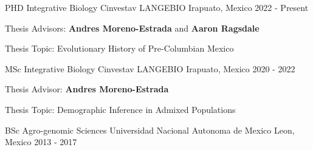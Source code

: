 

\begin{cventries}

\cventry
    {PHD Integrative Biology} %
    {Cinvestav LANGEBIO} %
    {Irapuato, Mexico} %
    {2022 - Present} %
    {
      \begin{cvitems} %
      \item {Thesis Advisors: \textbf{Andres Moreno-Estrada} and \textbf{Aaron Ragsdale}}
      \item {Thesis Topic: Evolutionary History of Pre-Columbian Mexico}
      \end{cvitems}
    }

\cventry
    {MSc Integrative Biology} %
    {Cinvestav LANGEBIO} %
    {Irapuato, Mexico} %
    {2020 - 2022} %
    {
      \begin{cvitems} %
      \item {Thesis Advisor: \textbf{Andres Moreno-Estrada}}
      \item {Thesis Topic: Demographic Inference in Admixed Populations}
      \end{cvitems}
    }
    
  \cventry
    {BSc Agro-genomic Sciences} %
    {Universidad Nacional Autonoma de Mexico} %
    {Leon, Mexico} %
    {2013 - 2017} %
    {
      \begin{cvitems} %
      \end{cvitems}
    }
\end{cventries}

